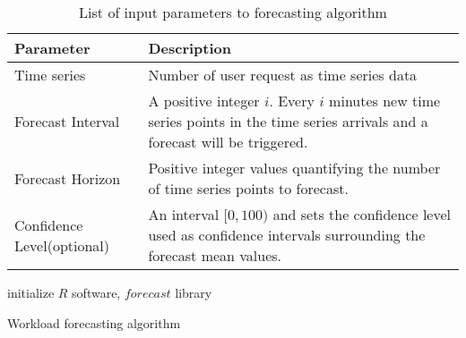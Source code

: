\begin{flushleft}
  \begin{table}
    \begin{tabular}{ | L{5cm} | L{5cm} |}
      \hline
      Parameter & Description \\ \hline
      Time series & Number of user request as time series data \\ \hline
      Forecast Interval & A positive integer \(i\). Every \(i\) minutes new time series points in the time series arrivals and a forecast will be triggered. \\ \hline
      Forecast Horizon & Positive integer values quantifying the number of time series points to forecast.  \\ \hline
      Confidence Level(optional)  & An interval \([0,100)\) and sets the  confidence level used as confidence  intervals  surrounding  the forecast mean values.\\ \hline
    \end{tabular}
    \caption{List of input parameters to forecasting algorithm}
     \label{table:forecastparameter}
\end{table}
\end{flushleft}

\LinesNumbered
\begin{algorithm}[H]
 initialize \(R\) software, \(forecast\) library \;
  \caption{Workload forecasting algorithm}
  \label{algo:forecastalgo}
 \end{algorithm}


